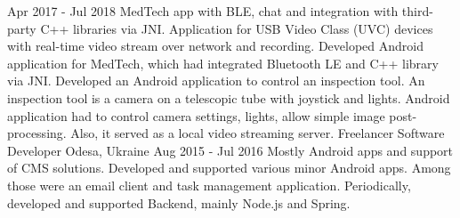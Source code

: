  {Apr 2017 - Jul 2018}
  {
    MedTech app with BLE, chat and integration with third-party C++ libraries via JNI.
    \newline
    Application for USB Video Class (UVC) devices with real-time video stream over network and recording.
  }
  {
    Developed Android application for MedTech, which had integrated Bluetooth LE and C++ library via JNI.
    \newline
    Developed an Android application to control an inspection tool.
    An inspection tool is a camera on a telescopic tube with joystick and lights.
    Android application had to control camera settings, lights, allow simple image post-processing.
    Also, it served as a local video streaming server.
  }
\cvexperience
  {Freelancer}
  {Software Developer}
  {Odesa, Ukraine}
  {Aug 2015 - Jul 2016}
  {
    Mostly Android apps and support of CMS solutions.
  }
  {
    Developed and supported various minor Android apps. Among those were an email client and task management application.
    \newline
    Periodically, developed and supported Backend, mainly Node.js and Spring.
  }

